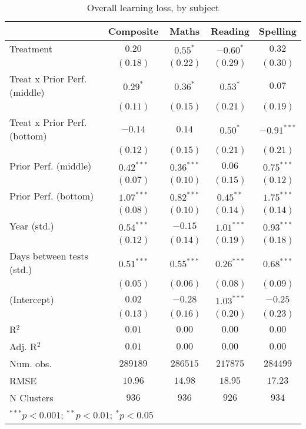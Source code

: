 
\begin{table}
\begin{center}
\begin{tabular}{l c c c c}
\hline
 & Composite & Maths & Reading & Spelling \\
\hline
Treatment                    & $0.20$       & $0.55^{*}$   & $-0.60^{*}$  & $0.32$        \\
                             & $(0.18)$     & $(0.22)$     & $(0.29)$     & $(0.30)$      \\
Treat x Prior Perf. (middle) & $0.29^{*}$   & $0.36^{*}$   & $0.53^{*}$   & $0.07$        \\
                             & $(0.11)$     & $(0.15)$     & $(0.21)$     & $(0.19)$      \\
Treat x Prior Perf. (bottom) & $-0.14$      & $0.14$       & $0.50^{*}$   & $-0.91^{***}$ \\
                             & $(0.12)$     & $(0.15)$     & $(0.21)$     & $(0.21)$      \\
Prior Perf. (middle)         & $0.42^{***}$ & $0.36^{***}$ & $0.06$       & $0.75^{***}$  \\
                             & $(0.07)$     & $(0.10)$     & $(0.15)$     & $(0.12)$      \\
Prior Perf. (bottom)         & $1.07^{***}$ & $0.82^{***}$ & $0.45^{**}$  & $1.75^{***}$  \\
                             & $(0.08)$     & $(0.10)$     & $(0.14)$     & $(0.14)$      \\
Year (std.)                  & $0.54^{***}$ & $-0.15$      & $1.01^{***}$ & $0.93^{***}$  \\
                             & $(0.12)$     & $(0.14)$     & $(0.19)$     & $(0.18)$      \\
Days between tests (std.)    & $0.51^{***}$ & $0.55^{***}$ & $0.26^{***}$ & $0.68^{***}$  \\
                             & $(0.05)$     & $(0.06)$     & $(0.08)$     & $(0.09)$      \\
(Intercept)                  & $0.02$       & $-0.28$      & $1.03^{***}$ & $-0.25$       \\
                             & $(0.13)$     & $(0.16)$     & $(0.20)$     & $(0.23)$      \\
\hline
R$^2$                        & $0.01$       & $0.00$       & $0.00$       & $0.00$        \\
Adj. R$^2$                   & $0.01$       & $0.00$       & $0.00$       & $0.00$        \\
Num. obs.                    & $289189$     & $286515$     & $217875$     & $284499$      \\
RMSE                         & $10.96$      & $14.98$      & $18.95$      & $17.23$       \\
N Clusters                   & $936$        & $936$        & $926$        & $934$         \\
\hline
\multicolumn{5}{l}{\scriptsize{$^{***}p<0.001$; $^{**}p<0.01$; $^{*}p<0.05$}}
\end{tabular}
\caption{Overall learning loss, by subject}
\label{table:overall}
\end{center}
\end{table}
